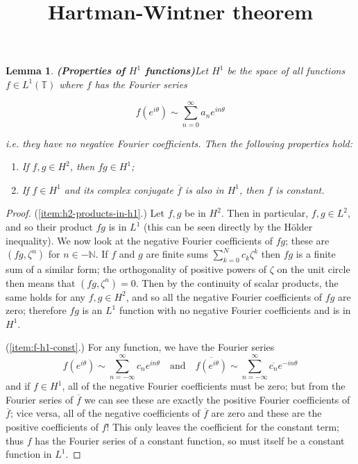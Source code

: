 \documentclass{article}
\title{Hartman-Wintner theorem}
\author{}
\date{}
\newtheorem{lemma}[theorem]{Lemma}
\begin{document}
\maketitle

\begin{lemma}{\textbf{(Properties of $H^1$ functions)}}\label{thm:h1-properties}
Let $H^1$ be the space of all functions $f \in L^1(\mathbb{T})$ where $f$ has the Fourier series

$$f(e^{i \theta}) \sim \sum_{n=0}^\infty a_n e^{i n \theta}$$

i.e. they have no negative Fourier coefficients. Then the following properties hold:
\begin{enumerate}
\item\label{item:h2-products-in-h1} If $f, g \in H^2$, then $fg \in H^1$;
\item\label{item:f-h1-const} If $f \in H^1$ and its complex conjugate $\overline{f}$ is also in $H^1$, then $f$ is constant.
\end{enumerate}
\end{lemma}
\begin{proof}
(\ref{item:h2-products-in-h1}.) Let $f, g$ be in $H^2$. Then in particular, $f, g \in L^2$, and so their product $fg$ is in $L^1$ (this can be seen directly by the H\"older inequality). We now look at the negative Fourier coefficients of
$fg$; these are $(fg, \zeta^n)$ for $n \in -\mathbb{N}$. If $f$ and $g$ are finite sums $\sum_{k=0}^N c_k \zeta^k$ then $fg$ is a finite sum of a similar 
form; the orthogonality of positive powers of $\zeta$ on the unit circle then means that $(fg, \zeta^n) = 0$. Then by the continuity of scalar products,
the same holds for any $f, g \in H^2$, and so all the negative Fourier coefficients of $fg$ are zero; therefore $fg$ is an $L^1$ function with no negative 
Fourier coefficients and is in $H^1$.

(\ref{item:f-h1-const}.) For any function, we have the Fourier series
\begin{equation*}
f(e^{i \theta}) \sim \sum_{n=-\infty}^\infty c_n e^{i n \theta} \quad\text{and}\quad \overline{f(e^{i \theta})} \sim \sum_{n=-\infty}^\infty \overline{c_n} e^{-i n \theta}
\end{equation*}
and if $f \in H^1$, all of the negative Fourier coefficients must be zero; but from the Fourier series of $\overline{f}$ we can see these are exactly
the positive Fourier coefficients of $\overline{f}$; vice versa, all of the negative coefficients of $\overline{f}$ are zero and these are the positive
coefficients of $f$! This only leaves the coefficient for the constant term; thus $f$ has the Fourier series of a constant function, so must itself
be a constant function in $L^1$.
\end{proof}
\end{document}
